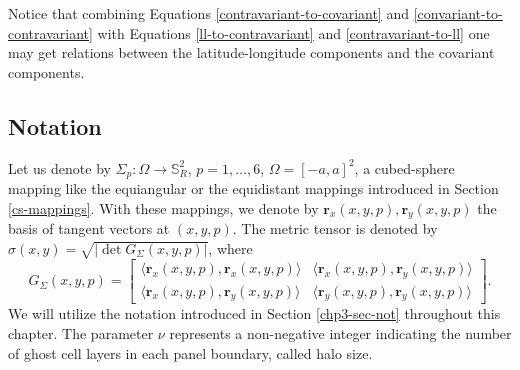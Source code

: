 Notice that combining Equations \eqref{contravariant-to-covariant}
and \eqref{convariant-to-contravariant} with Equations 
\eqref{ll-to-contravariant} and \eqref{contravariant-to-ll}
one may get relations between the latitude-longitude 
components and the covariant components.

\subsection{Notation}
\label{cs-notation}
Let us denote by $\Sigma_p: \Omega \to \mathbb{S}^2_R$, $p=1,\ldots,6$, $\Omega=[-a,a]^2$,
a cubed-sphere mapping like the equiangular or the equidistant mappings introduced in
Section \ref{cs-mappings}.
With these mappings, we denote by ${\boldsymbol{r}_x(x,y,p),\boldsymbol{r}_y(x,y,p)}$
the basis of tangent vectors at $(x,y,p)$.
The metric tensor is denoted by $\sigma(x,y) =\sqrt{|\det{G_{\Sigma}(x,y,p)}|}$, where
\begin{equation}
	\label{chp3-sigma-metric-tensor}
	G_{\Sigma}(x,y,p) = 
	\begin{bmatrix}
		\langle \boldsymbol{r}_{x}(x,y,p), \boldsymbol{r}_{x}(x,y,p) \rangle & 
		\langle \boldsymbol{r}_{x}(x,y,p), \boldsymbol{r}_{y}(x,y,p) \rangle \\
		\langle \boldsymbol{r}_{x}(x,y,p), \boldsymbol{r}_{y}(x,y,p) \rangle  &
		\langle \boldsymbol{r}_{y}(x,y,p), \boldsymbol{r}_{y}(x,y,p) \rangle 
	\end{bmatrix}.
\end{equation}
We will utilize the notation introduced in Section \ref{chp3-sec-not} throughout this chapter.
The parameter $\nu$ represents a non-negative integer indicating the number of ghost cell layers in each panel boundary, called halo size.

